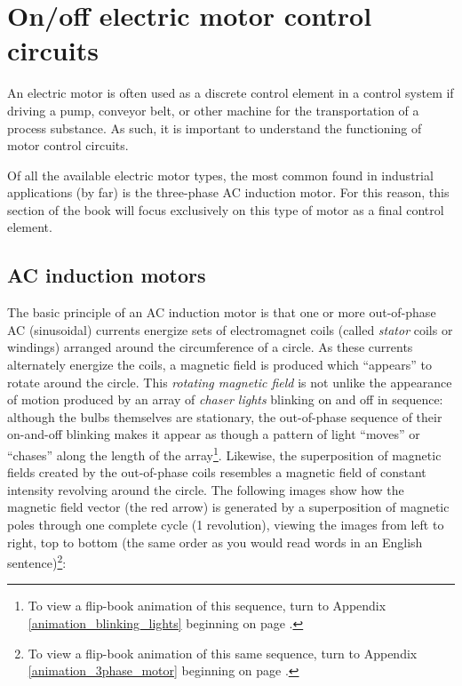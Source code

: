 \filbreak
\section{On/off electric motor control circuits}

An electric motor is often used as a discrete control element in a control system if driving a pump, conveyor belt, or other machine for the transportation of a process substance.  As such, it is important to understand the functioning of motor control circuits.

Of all the available electric motor types, the most common found in industrial applications (by far) is the three-phase AC induction motor.  For this reason, this section of the book will focus exclusively on this type of motor as a final control element.








\filbreak
\subsection{AC induction motors}

The basic principle of an AC induction motor is that one or more out-of-phase AC (sinusoidal) currents energize sets of electromagnet coils (called \textit{stator} coils or windings) arranged around the circumference of a circle.  As these currents alternately energize the coils, a magnetic field is produced which ``appears'' to rotate around the circle.  This \textit{rotating magnetic field} is not unlike the appearance of motion produced by an array of \textit{chaser lights} blinking on and off in sequence: although the bulbs themselves are stationary, the out-of-phase sequence of their on-and-off blinking makes it appear as though a pattern of light ``moves'' or ``chases'' along the length of the array\footnote{To view a flip-book animation of this sequence, turn to Appendix \ref{animation_blinking_lights} beginning on page \pageref{animation_blinking_lights}.}.  Likewise, the superposition of magnetic fields created by the out-of-phase coils resembles a magnetic field of constant intensity revolving around the circle.  The following images show how the magnetic field vector (the red arrow) is generated by a superposition of magnetic poles through one complete cycle (1 revolution), viewing the images from left to right, top to bottom (the same order as you would read words in an English sentence)\footnote{To view a flip-book animation of this same sequence, turn to Appendix \ref{animation_3phase_motor} beginning on page \pageref{animation_3phase_motor}.}:    

